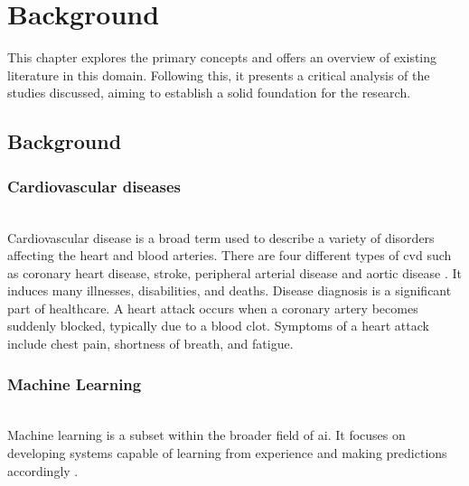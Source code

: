 \section{Background}
\label{sec:back}

This chapter explores the primary concepts and offers an overview of existing literature in this domain. Following this, it presents a critical analysis of the studies discussed, aiming to establish a solid foundation for the research.

\subsection{Background}
\label{sec:back_A}
\subsubsection{Cardiovascular diseases} \leavevmode
\\Cardiovascular disease is a broad term used to describe a variety of disorders affecting the heart and blood arteries. There are four different types of \gls{cvd} such as coronary heart disease, stroke, peripheral arterial disease and aortic disease \citep{yassine2014automatic}. It induces many illnesses, disabilities, and deaths\citep{hospitalization2001}. Disease diagnosis is a significant part of healthcare. A heart attack occurs when a coronary artery becomes suddenly blocked, typically due to a blood clot. Symptoms of a heart attack include chest pain, shortness of breath, and fatigue.

\vspace{0.5em} %

\subsubsection{Machine Learning} \leavevmode
\\Machine learning is a subset within the broader field of \gls{ai}. It focuses on developing systems capable of learning from experience and making predictions accordingly \citep{shah2020heart}.

